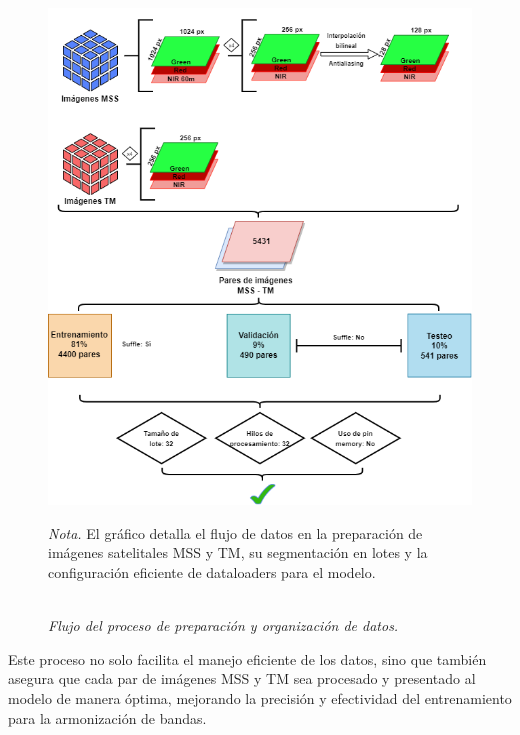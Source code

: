                 \begin{figure}[H] 
                    \caption{\doublespacing \\ \textit{Flujo del proceso de preparación y organización de datos.}} 
                    \centering
                    \includegraphics[width=1\linewidth]{2_CAPITULO4/IMG/dataloader.png}
                    \begin{justify}
                        \textit{Nota.} El gráfico detalla el flujo de datos en la preparación de imágenes satelitales MSS y TM, su segmentación en lotes y la configuración eficiente de dataloaders para el modelo.
                    \end{justify}                    
                    \label{dataloader}
                \end{figure}

                Este proceso no solo facilita el manejo eficiente de los datos, sino que también asegura que cada par de imágenes MSS y TM sea procesado y presentado al modelo de manera óptima, mejorando la precisión y efectividad del entrenamiento para la armonización de bandas.



